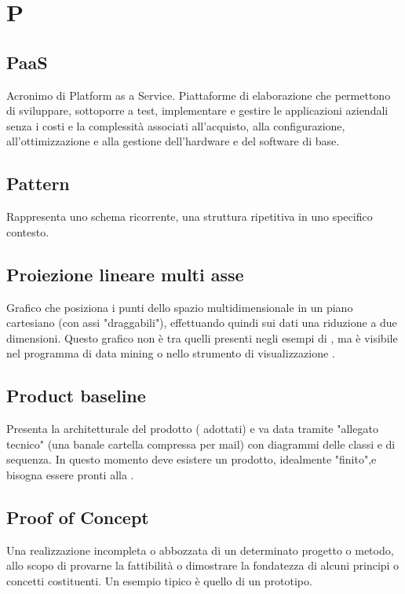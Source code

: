 \section*{P}
\markright{}
\subsection*{PaaS}
Acronimo di Platform as a Service. Piattaforme di elaborazione che permettono di sviluppare, sottoporre a test, implementare e gestire le applicazioni aziendali senza i costi e la complessità associati all'acquisto, alla configurazione, all'ottimizzazione e alla gestione dell'hardware e del software di base. 

\subsection*{Pattern}
Rappresenta uno schema ricorrente, una struttura ripetitiva in uno specifico contesto. 

\subsection*{Proiezione lineare multi asse}
Grafico che posiziona i punti dello spazio multidimensionale in un piano cartesiano (con assi "draggabili"), effettuando quindi sui dati una riduzione a due dimensioni. Questo grafico non è tra quelli presenti negli esempi di , ma è visibile nel programma di data mining  o nello strumento di visualizzazione .

\subsection*{Product baseline}
Presenta la  architetturale del prodotto ( adottati) e va data tramite "allegato tecnico" (una banale cartella compressa per mail) con diagrammi delle classi e di sequenza. In questo momento deve esistere un prodotto, idealmente "finito",e bisogna essere pronti alla .

\subsection*{Proof of Concept}
Una realizzazione incompleta o abbozzata di un determinato progetto o metodo, allo scopo di provarne la fattibilità o dimostrare la fondatezza di alcuni principi o concetti costituenti. Un esempio tipico è quello di un prototipo. 

